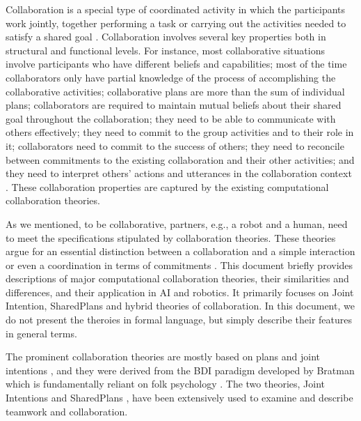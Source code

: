 \documentclass[12pt]{report}
\begin{document}
Collaboration is a special type of coordinated activity in which the
participants work jointly, together performing a task or carrying out the
activities needed to satisfy a shared goal \cite{grosz:collaboration}.
Collaboration involves several key properties both in structural and functional
levels. For instance, most collaborative situations involve participants who
have different beliefs and capabilities; most of the time collaborators only
have partial knowledge of the process of accomplishing the collaborative
activities; collaborative plans are more than the sum of individual plans;
collaborators are required to maintain mutual beliefs about their shared goal
throughout the collaboration; they need to be able to communicate with others
effectively; they need to commit to the group activities and to their role in
it; collaborators need to commit to the success of others; they need to
reconcile between commitments to the existing collaboration and their other
activities; and they need to interpret others' actions and utterances in the
collaboration context \cite{grosz:mice-menus}. These collaboration properties
are captured by the existing computational collaboration theories.

As we mentioned, to be collaborative, partners, e.g., a robot and a human, need
to meet the specifications stipulated by collaboration theories. These theories
argue for an essential distinction between a collaboration and a simple
interaction or even a coordination in terms of commitments
\cite{grosz:shared-plans, lochbaum:collaborative-planning}. This document
briefly provides descriptions of major computational collaboration theories,
their similarities and differences, and their application in AI and robotics. It
primarily focuses on Joint Intention, SharedPlans and hybrid theories of
collaboration. In this document, we do not present the theroies in formal
language, but simply describe their features in general terms.

The prominent collaboration theories are mostly based on plans and joint
intentions \cite{cohen:teamwork} \cite{grosz:plans-discourse}
\cite{Litman:discourse-commonsense}, and they were derived from the BDI
paradigm developed by Bratman \cite{bratman:intentions-plans} which is
fundamentally reliant on folk psychology \cite{ravenscroft:folk}. The two
theories, Joint Intentions \cite{cohen:teamwork} and SharedPlans
\cite{grosz:plans-discourse}, have been extensively used to examine and describe
teamwork and collaboration.
\end{document}
